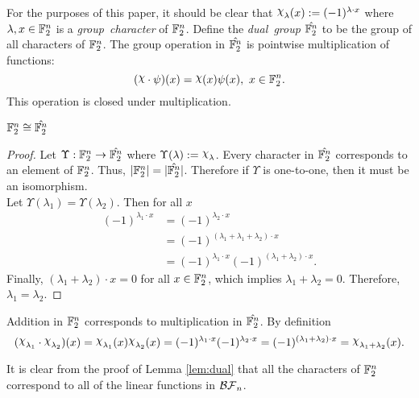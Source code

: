 For the purposes of this paper, it should be clear that
$\Chi_\lambda(x):=(-1)^{\lambda\cdot x}$ where $\lambda,x\in\mathbb{F}_2^n$ is a
{\em group\ character} of $\mathbb{F}_2^n$. Define the {\em dual\ group}
$\hat{\mathbb{F}_2^n}$ to be the group of all characters of $\mathbb{F}_2^n$. The group
operation
in $\hat{\mathbb{F}_2^n}$ is pointwise multiplication of functions:
\[
(\Chi\cdot\psi)(x)=\Chi(x)\psi(x),\ x\in\gftwo^n.
\]
This operation is closed under multiplication.

\begin{lemma}\label{lem:dual}
  $\mathbb{F}_2^n\cong\hat{\mathbb{F}_2^n}$
\end{lemma}

\begin{proof}
  \par Let $\Upsilon:\mathbb{F}_2^n\rightarrow\hat{\mathbb{F}_2^n}$ where
  $\Upsilon(\lambda):=\Chi_\lambda$.
  Every character in $\hat{\mathbb{F}_2^n}$ corresponds to an element of
  $\mathbb{F}_2^n$. Thus, $\lvert\mathbb{F}_2^n\rvert=\lvert\hat{\mathbb{F}_2^n}\rvert$.
  Therefore if $\Upsilon$ is one-to-one, then it must be an isomorphism.\\
  Let $\Upsilon(\lambda_1)=\Upsilon(\lambda_2)$. Then for all $x$
  \begin{align*}
    (-1)^{\lambda_1\cdot x}
      &=(-1)^{\lambda_2\cdot x}\\
      &=(-1)^{(\lambda_1+\lambda_1+\lambda_2)\cdot x}\\
      &=(-1)^{\lambda_1\cdot x}(-1)^{(\lambda_1+\lambda_2)\cdot x}.
  \end{align*}
  Finally, $(\lambda_1+\lambda_2)\cdot x=0$ for all $x\in\mathbb{F}_2^n$, which
  implies $\lambda_1+\lambda_2=0$. Therefore, $\lambda_1=\lambda_2$.
\end{proof}

\par Addition in $\mathbb{F}_2^n$ corresponds to multiplication in
$\hat{\mathbb{F}_2^n}$. By definition
\[
(\Chi_{\lambda_1}\cdot\Chi_{\lambda_2})(x)
  =\Chi_{\lambda_1}(x)\Chi_{\lambda_2}(x)
  =(-1)^{\lambda_1\cdot x}(-1)^{\lambda_2\cdot x}
  =(-1)^{(\lambda_1+\lambda_2)\cdot x}
  =\Chi_{\lambda_1+\lambda_2}(x).
\]

\par It is clear from the proof of Lemma \ref{lem:dual} that all the characters
of $\mathbb{F}_2^n$ correspond to all of the linear functions in $\mathcal{BF}_n$.

